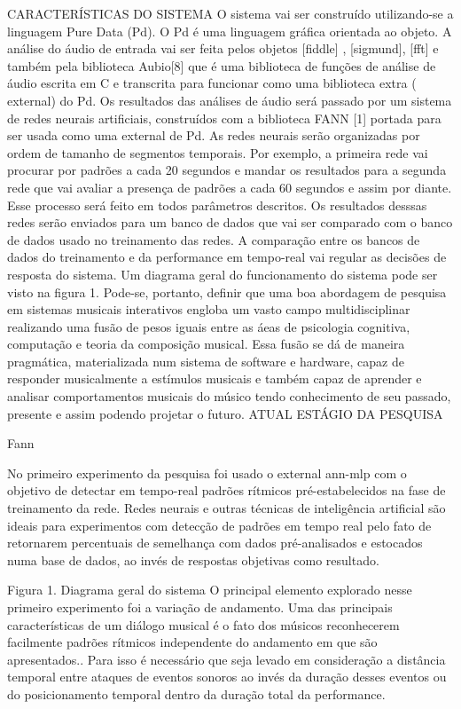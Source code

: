\documentclass{ppgmus}
\begin{document}
CARACTERÍSTICAS DO SISTEMA
O sistema vai ser construído utilizando-se a linguagem Pure Data (Pd). O Pd é uma linguagem gráfica orientada ao objeto. 
A análise do áudio de entrada vai ser feita pelos objetos [fiddle\texttildelow] , [sigmund\texttildelow], [fft\texttildelow]
 e também pela biblioteca Aubio[8] que 
é uma biblioteca de funções de análise de áudio escrita em C e transcrita para funcionar como uma biblioteca extra (
external) do Pd. Os resultados das análises de áudio será passado por um sistema de redes neurais artificiais, 
construídos com a biblioteca FANN [1] portada para ser usada como uma external de Pd. As redes neurais serão organizadas 
por ordem de tamanho de segmentos temporais. Por exemplo, a primeira rede vai procurar por padrões a cada 20 segundos e 
mandar os resultados para a segunda rede que vai avaliar a presença de padrões a cada 60 segundos e assim por diante. 
Esse processo será feito em todos parâmetros descritos. Os resultados desssas redes serão enviados para um banco de dados
 que vai ser comparado com o banco de dados usado no treinamento das redes. A comparação entre os bancos de dados do 
treinamento e da performance em tempo-real vai regular as decisões de resposta do sistema. Um diagrama geral do 
funcionamento do sistema pode ser visto na figura 1.
  Pode-se, portanto, definir que uma boa abordagem de pesquisa em sistemas musicais interativos engloba um vasto 
campo multidisciplinar realizando uma fusão de pesos iguais entre as áeas de psicologia cognitiva, computação e teoria 
da composição musical. Essa fusão se dá de maneira pragmática, materializada num sistema de software e hardware, 
capaz de responder musicalmente a estímulos musicais e também capaz de aprender e analisar comportamentos musicais 
do músico tendo conhecimento de seu passado, presente e assim podendo projetar o futuro.
 ATUAL ESTÁGIO DA PESQUISA

 Fann 

No primeiro experimento da pesquisa  foi usado o external ann-mlp com o objetivo de detectar  em tempo-real padrões 
rítmicos pré-estabelecidos na fase de treinamento da rede.
   Redes neurais e outras técnicas de inteligência artificial são ideais para experimentos com detecção de padrões em 
tempo real  pelo fato de retornarem percentuais de semelhança com dados pré-analisados e estocados numa base de dados, 
ao invés de respostas objetivas como resultado.

Figura 1. Diagrama geral do sistema
 O principal elemento explorado  nesse primeiro experimento foi a variação de andamento. Uma das principais 
características de um diálogo musical é o fato dos músicos reconhecerem facilmente padrões rítmicos independente do 
andamento em que são apresentados.. Para isso é necessário que seja levado em consideração a distância temporal entre 
ataques de eventos sonoros ao invés da duração desses eventos ou do posicionamento temporal dentro da duração total da 
performance.
\end{document}
